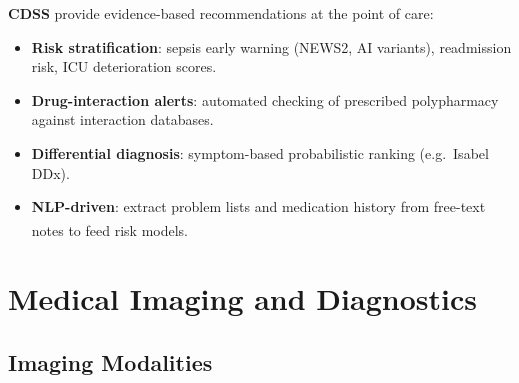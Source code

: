 \begin{tcbitemize}[ skin=sectionraster ]
    \tcbitem[title={Clinical Decision Support Systems}, raster multicolumn=3]
    \textbf{CDSS} provide evidence-based recommendations at the point of care:
    \begin{itemize}
        \item \textbf{Risk stratification}: sepsis early warning (NEWS2, AI variants), readmission risk, ICU deterioration scores.
        \item \textbf{Drug-interaction alerts}: automated checking of prescribed polypharmacy against interaction databases.
        \item \textbf{Differential diagnosis}: symptom-based probabilistic ranking (e.g.\ Isabel DDx).
        \item \textbf{NLP-driven}: extract problem lists and medication history from free-text notes to feed risk models.\textsuperscript{\cite[][p.~465]{juhnArtificialIntelligenceNLP2020}}
    \end{itemize}
\end{tcbitemize}

\section{Medical Imaging and Diagnostics}

\subsection{Imaging Modalities}

